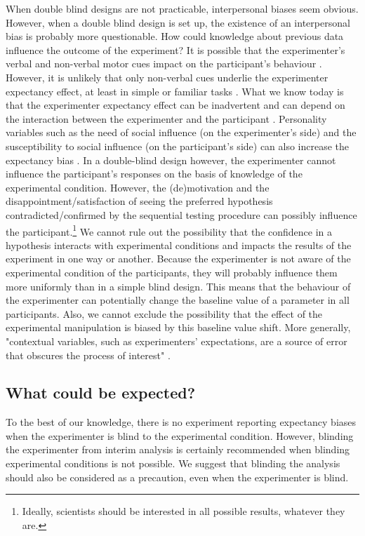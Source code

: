 \documentclass[a4paper,jou,natbib,floatsintext,donotrepeattitle]{apa6}
\begin{document}
When double blind designs are not practicable, interpersonal biases seem obvious. However, when a double blind design is set up, the existence of an interpersonal bias is probably more questionable. How could knowledge about previous data influence the outcome of the experiment? It is possible that the experimenter's verbal and non-verbal motor cues impact on the participant's behaviour \citep{zoble_interaction_1969}. However, it is unlikely that only non-verbal cues underlie the experimenter expectancy effect, at least in simple or familiar tasks \citep{Hazelrigg_Personality_1991}. What we know today is that the experimenter expectancy effect can be inadvertent and can depend on the interaction between the experimenter and the participant \citep{gilder_role_2018,Hazelrigg_Personality_1991}. Personality variables such as the need of social influence (on the experimenter's side) and the susceptibility to social influence (on the participant's side) can also increase the expectancy bias \citep{Hazelrigg_Personality_1991}. In a double-blind design however, the experimenter cannot influence the participant's responses on the basis of knowledge of the experimental condition. However, the (de)motivation and the disappointment/satisfaction of seeing the preferred hypothesis contradicted/confirmed by the sequential testing procedure can possibly influence the participant.\footnote{Ideally, scientists should be interested in all possible results, whatever they are.} We cannot rule out the possibility that the confidence in a hypothesis interacts with experimental conditions and impacts the results of the experiment in one way or another. Because the experimenter is not aware of the experimental condition of the participants, they will probably influence them more uniformly than in a simple blind design. This means that the behaviour of the experimenter can potentially change the baseline value of a parameter in all participants. Also, we cannot exclude the possibility that the effect of the experimental manipulation is biased by this baseline value shift. More generally, "contextual variables, such as experimenters’ expectations, are a source of error that obscures the process of interest" \citep{klein_low_2012}.\par

\subsection{What could be expected?}

To the best of our knowledge, there is no experiment reporting expectancy biases when the experimenter is blind to the experimental condition. However, blinding the experimenter from interim analysis is certainly recommended \citep{lakens_performing_2014} when blinding experimental conditions is not possible. We suggest that blinding the analysis should also be considered as a precaution, even when the experimenter is blind.
\end{document}
